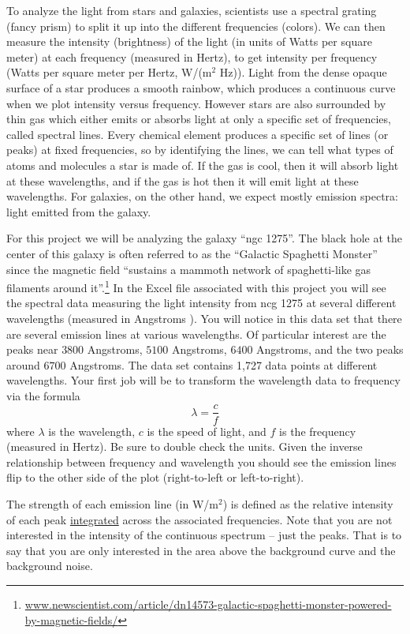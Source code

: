 To analyze the light from stars and galaxies, scientists use a spectral grating (fancy prism) to
split it up into the different frequencies (colors). We can then measure the intensity
(brightness) of the light (in units of Watts per square meter) at each frequency (measured
in Hertz), to get intensity per frequency (Watts per square meter per Hertz, W/(m$^2$
Hz)). Light from the dense opaque surface of a star produces a smooth rainbow, which
produces a continuous curve when we plot intensity versus frequency. However stars are
also surrounded by thin gas which either emits or absorbs light at only a specific set of
frequencies, called spectral lines. Every chemical element produces a specific set of
lines (or peaks) at fixed frequencies, so by identifying the lines, we can tell what types of atoms
and molecules a star is made of. If the gas is cool, then it will absorb light at these
wavelengths, and if the gas is hot then it will emit light at these wavelengths. For
galaxies, on the other hand, we expect mostly emission spectra: light emitted from the
galaxy.  

For this project we will be analyzing the galaxy ``ngc 1275''.  The black hole at the
center of this galaxy is often referred to as the ``Galactic Spaghetti Monster'' since the magnetic field ``sustains a mammoth network of
spaghetti-like gas filaments around it''.\footnote{\href{https://www.newscientist.com/article/dn14573-galactic-spaghetti-monster-powered-by-magnetic-fields/}{www.newscientist.com/article/dn14573-galactic-spaghetti-monster-powered-by-magnetic-fields/}}
% 
In the Excel file associated with this project you will see the spectral data measuring the
light intensity from ncg 1275 at several different wavelengths (measured in Angstroms
).
You will notice in this data set that there are several emission lines at various
wavelengths.  Of particular interest are the peaks near
$3800$ Angstroms, $5100$ Angstroms, $6400$ Angstroms, and the two peaks around $6700$ Angstroms. The data
set contains 1,727 data points at different wavelengths. Your first job will be to
transform the wavelength data to frequency via the formula
\[ \lambda = \frac{c}{f} \]
where $\lambda$ is the wavelength, $c$ is the speed of light, and $f$ is the frequency
(measured in Hertz). Be sure to double check the units. Given the inverse relationship
between frequency and wavelength you should see the emission lines flip to the other side
of the plot (right-to-left or left-to-right).  


The strength of each emission line (in W/m$^2$) is defined as the relative intensity of each peak
\underline{integrated}
across the associated frequencies. Note that you are not interested in the intensity of the continuous
spectrum -- just the peaks. That is to say that you are only interested in the area above
the background curve and the background noise.  

